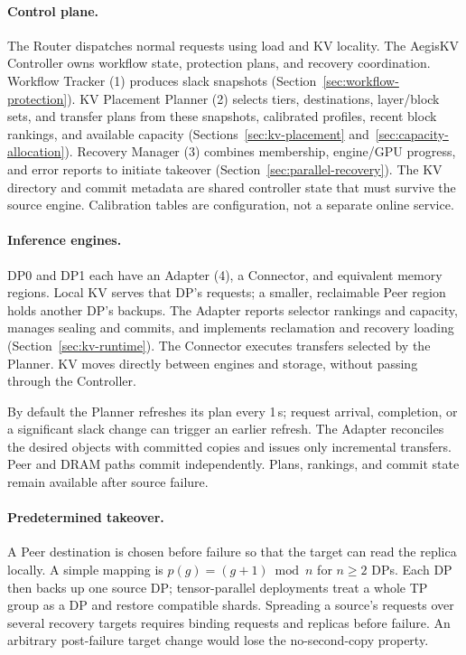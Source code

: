 \paragraph{Control plane.}
The Router dispatches normal requests using load and KV locality.
The AegisKV Controller owns workflow state, protection plans, and recovery
coordination. Workflow Tracker (1) produces slack snapshots
(Section~\ref{sec:workflow-protection}). KV Placement Planner (2) selects
tiers, destinations, layer/block sets, and transfer plans from these
snapshots, calibrated profiles, recent block rankings, and available
capacity (Sections~\ref{sec:kv-placement} and~\ref{sec:capacity-allocation}).
Recovery Manager (3) combines membership, engine/GPU progress, and error
reports to initiate takeover (Section~\ref{sec:parallel-recovery}).
The KV directory and commit metadata are shared controller state that
must survive the source engine. Calibration tables are configuration,
not a separate online service.

\paragraph{Inference engines.}
DP0 and DP1 each have an Adapter (4), a Connector, and equivalent memory
regions. Local KV serves that DP's requests; a smaller, reclaimable Peer
region holds another DP's backups. The Adapter reports selector rankings
and capacity, manages sealing and commits, and implements reclamation and
recovery loading (Section~\ref{sec:kv-runtime}). The Connector executes
transfers selected by the Planner. KV moves directly between engines and
storage, without passing through the Controller.

By default the Planner refreshes its plan every 1\,s; request arrival,
completion, or a significant slack change can trigger an earlier refresh.
The Adapter reconciles the desired objects with committed copies and
issues only incremental transfers. Peer and DRAM paths commit independently.
Plans, rankings, and commit state remain available after source failure.

\paragraph{Predetermined takeover.}
A Peer destination is chosen before failure so that the target can read
the replica locally. A simple mapping is $p(g)=(g+1)\bmod n$ for $n\ge2$
DPs. Each DP then backs up one source DP; tensor-parallel deployments
treat a whole TP group as a DP and restore compatible shards.
Spreading a source's requests over several recovery targets requires
binding requests and replicas before failure. An arbitrary post-failure
target change would lose the no-second-copy property.

